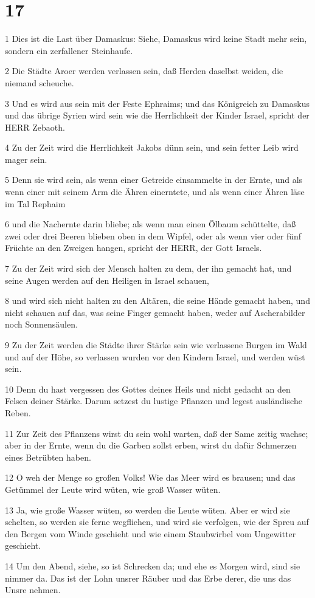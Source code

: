 \chapter{17}

\par 1 Dies ist die Last über Damaskus: Siehe, Damaskus wird keine Stadt mehr sein, sondern ein zerfallener Steinhaufe.
\par 2 Die Städte Aroer werden verlassen sein, daß Herden daselbst weiden, die niemand scheuche.
\par 3 Und es wird aus sein mit der Feste Ephraims; und das Königreich zu Damaskus und das übrige Syrien wird sein wie die Herrlichkeit der Kinder Israel, spricht der HERR Zebaoth.
\par 4 Zu der Zeit wird die Herrlichkeit Jakobs dünn sein, und sein fetter Leib wird mager sein.
\par 5 Denn sie wird sein, als wenn einer Getreide einsammelte in der Ernte, und als wenn einer mit seinem Arm die Ähren einerntete, und als wenn einer Ähren läse im Tal Rephaim
\par 6 und die Nachernte darin bliebe; als wenn man einen Ölbaum schüttelte, daß zwei oder drei Beeren blieben oben in dem Wipfel, oder als wenn vier oder fünf Früchte an den Zweigen hangen, spricht der HERR, der Gott Israels.
\par 7 Zu der Zeit wird sich der Mensch halten zu dem, der ihn gemacht hat, und seine Augen werden auf den Heiligen in Israel schauen,
\par 8 und wird sich nicht halten zu den Altären, die seine Hände gemacht haben, und nicht schauen auf das, was seine Finger gemacht haben, weder auf Ascherabilder noch Sonnensäulen.
\par 9 Zu der Zeit werden die Städte ihrer Stärke sein wie verlassene Burgen im Wald und auf der Höhe, so verlassen wurden vor den Kindern Israel, und werden wüst sein.
\par 10 Denn du hast vergessen des Gottes deines Heils und nicht gedacht an den Felsen deiner Stärke. Darum setzest du lustige Pflanzen und legest ausländische Reben.
\par 11 Zur Zeit des Pflanzens wirst du sein wohl warten, daß der Same zeitig wachse; aber in der Ernte, wenn du die Garben sollst erben, wirst du dafür Schmerzen eines Betrübten haben.
\par 12 O weh der Menge so großen Volks! Wie das Meer wird es brausen; und das Getümmel der Leute wird wüten, wie groß Wasser wüten.
\par 13 Ja, wie große Wasser wüten, so werden die Leute wüten. Aber er wird sie schelten, so werden sie ferne wegfliehen, und wird sie verfolgen, wie der Spreu auf den Bergen vom Winde geschieht und wie einem Staubwirbel vom Ungewitter geschieht.
\par 14 Um den Abend, siehe, so ist Schrecken da; und ehe es Morgen wird, sind sie nimmer da. Das ist der Lohn unsrer Räuber und das Erbe derer, die uns das Unsre nehmen.

